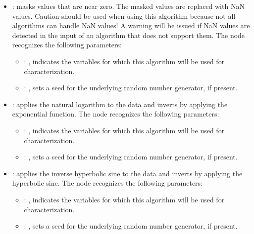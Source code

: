 \begin{itemize}
    \item {}:
      masks values that are near zero. The masked values are replaced with NaN     values. Caution
      should be used when using this algorithm because not all algorithms can handle     NaN values!
      A warning will be issued if NaN values are detected in the input of an algorithm that     does
      not support them.
      The  node recognizes the following parameters:
        \begin{itemize}
          \item {}: , 
            indicates the variables for which this algorithm will be used for characterization.
          \item {}: , 
            sets a seed for the underlying random number generator, if present.
      \end{itemize}

    \item {}:
      applies the natural logarithm to the data and inverts by applying the
      exponential function.
      The  node recognizes the following parameters:
        \begin{itemize}
          \item {}: , 
            indicates the variables for which this algorithm will be used for characterization.
          \item {}: , 
            sets a seed for the underlying random number generator, if present.
      \end{itemize}

    \item {}:
      applies the inverse hyperbolic sine to the data and inverts by applying
      the hyperbolic sine.
      The  node recognizes the following parameters:
        \begin{itemize}
          \item {}: , 
            indicates the variables for which this algorithm will be used for characterization.
          \item {}: , 
            sets a seed for the underlying random number generator, if present.
      \end{itemize}


\end{itemize}
